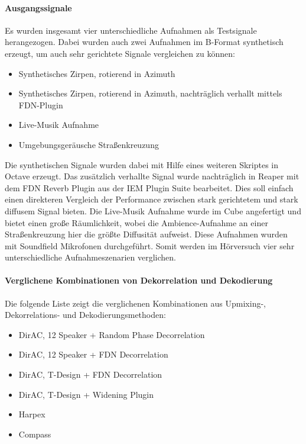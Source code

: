 \paragraph{Ausgangssignale}
Es wurden insgesamt vier unterschiedliche Aufnahmen als Testsignale herangezogen. Dabei wurden auch zwei Aufnahmen im B-Format synthetisch erzeugt, um auch sehr gerichtete Signale vergleichen zu können:

\begin{itemize}
	\item Synthetisches Zirpen, rotierend in Azimuth
	\item Synthetisches Zirpen, rotierend in Azimuth, nachträglich verhallt mittels FDN-Plugin
	\item Live-Musik Aufnahme
	\item Umgebungsgeräusche Straßenkreuzung
\end{itemize}

Die synthetischen Signale wurden dabei mit Hilfe eines weiteren Skriptes in Octave erzeugt. Das zusätzlich verhallte Signal wurde nachträglich in Reaper mit dem FDN Reverb Plugin aus der IEM Plugin Suite bearbeitet. Dies soll einfach einen direkteren Vergleich der Performance zwischen stark gerichtetem und stark diffusem Signal bieten. Die Live-Musik Aufnahme wurde im Cube angefertigt und bietet einen große Räumlichkeit, wobei die Ambience-Aufnahme an einer Straßenkreuzung hier die größte Diffusität aufweist. Diese Aufnahmen wurden mit Soundfield Mikrofonen durchgeführt. Somit werden im Hörversuch vier sehr unterschiedliche Aufnahmeszenarien verglichen.

\paragraph{Verglichene Kombinationen von Dekorrelation und Dekodierung}

Die folgende Liste zeigt die verglichenen Kombinationen aus Upmixing-, Dekorrelations- und Dekodierungsmethoden:

\begin{itemize}
	\item DirAC, 12 Speaker + Random Phase Decorrelation
	\item DirAC, 12 Speaker + FDN Decorrelation
	\item DirAC, T-Design + FDN Decorrelation
	\item DirAC, T-Design + Widening Plugin
	\item Harpex
	\item Compass
\end{itemize}


